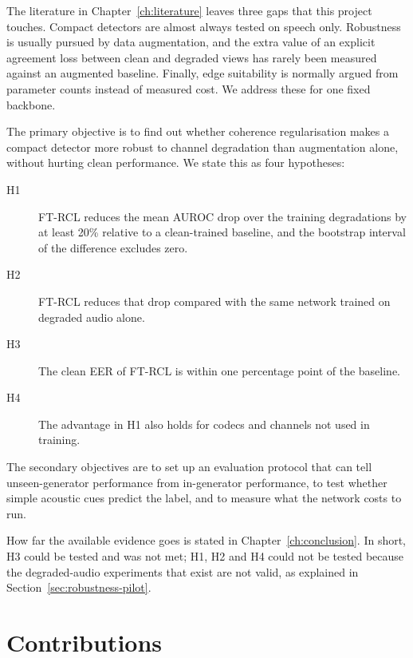 The literature in Chapter~\ref{ch:literature} leaves three gaps that this project touches. Compact detectors are almost always tested on speech only. Robustness is usually pursued by data augmentation, and the extra value of an explicit agreement loss between clean and degraded views has rarely been measured against an augmented baseline. Finally, edge suitability is normally argued from parameter counts instead of measured cost. We address these for one fixed backbone.

The primary objective is to find out whether coherence regularisation makes a compact detector more robust to channel degradation than augmentation alone, without hurting clean performance. We state this as four hypotheses:

\begin{description}
  \item[H1] FT-RCL reduces the mean AUROC drop over the training degradations by at least 20\% relative to a clean-trained baseline, and the bootstrap interval of the difference excludes zero.
  \item[H2] FT-RCL reduces that drop compared with the same network trained on degraded audio alone.
  \item[H3] The clean EER of FT-RCL is within one percentage point of the baseline.
  \item[H4] The advantage in H1 also holds for codecs and channels not used in training.
\end{description}

The secondary objectives are to set up an evaluation protocol that can tell unseen-generator performance from in-generator performance, to test whether simple acoustic cues predict the label, and to measure what the network costs to run.

How far the available evidence goes is stated in Chapter~\ref{ch:conclusion}. In short, H3 could be tested and was not met; H1, H2 and H4 could not be tested because the degraded-audio experiments that exist are not valid, as explained in Section~\ref{sec:robustness-pilot}.

\section{Contributions}

